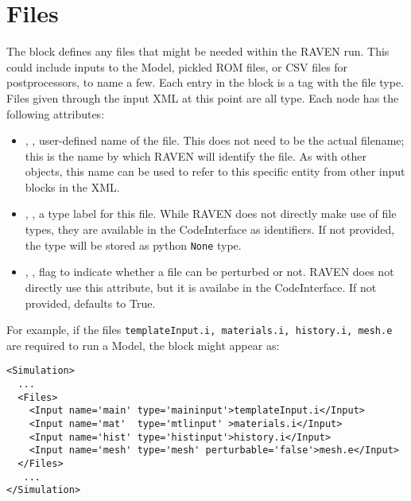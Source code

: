 \section{Files}
\label{sec:files}

The  block defines any files that might be needed within
the RAVEN run.  This could include inputs to the Model, pickled ROM files,
or CSV files for postprocessors, to name a few.
%
Each entry in the  block is a tag with the file type.  Files
given through the input XML at this point are all  type.
Each  node has the following attributes:
\vspace{-5mm}
\begin{itemize}
  \itemsep0em
  \item {}, , user-defined name
  of the file.  This does not need to be the actual filename; this is the name
  by which RAVEN will identify the file.
  \nb As with other objects, this name can be used to refer to this
  specific entity from other input blocks in the XML.
  \item {}, , a type label
  for this file.  While RAVEN does not directly make use of file types,
  they are available in the CodeInterface as identifiers.  If not provided,
  the type will be stored as python \texttt{None} type.

  \item {}, , flag
  to indicate whether a file can be perturbed or not. RAVEN does not
  directly use this attribute, but it is availabe in the CodeInterface.
  If not provided, defaults to True.
\end{itemize}
\vspace{-5mm}
For example, if the files \texttt{templateInput.i, materials.i, history.i, mesh.e}
 are required to run a Model, the  block might appear as:
\begin{lstlisting}[style=XML,morekeywords={name,file}] %moreemph={name,file}]
<Simulation>
  ...
  <Files>
    <Input name='main' type='maininput'>templateInput.i</Input>
    <Input name='mat'  type='mtlinput' >materials.i</Input>
    <Input name='hist' type='histinput'>history.i</Input>
    <Input name='mesh' type='mesh' perturbable='false'>mesh.e</Input>
  </Files>
   ...
</Simulation>
\end{lstlisting}
